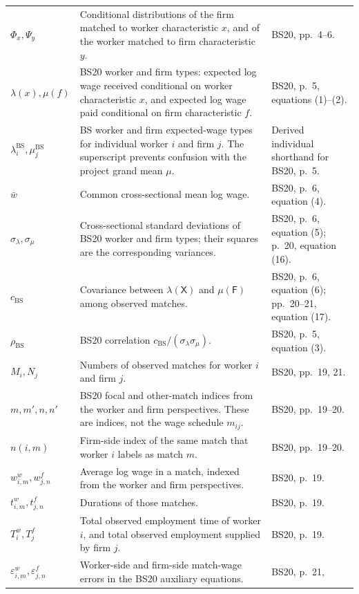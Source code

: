 \documentclass[11pt]{article}
\begin{document}
\begin{longtable}{p{}p{}p{}}
\(\Phi_x,\Psi_y\) & Conditional distributions of the firm matched to worker
characteristic \(x\), and of the worker matched to firm characteristic \(y\).
& BS20, pp.\ 4--6. \\
\(\lambda(x),\mu(f)\) & BS20 worker and firm types: expected log wage received
conditional on worker characteristic \(x\), and expected log wage paid
conditional on firm characteristic \(f\). &
BS20, p.\ 5, equations (1)--(2). \\
\(\lambda_i^{\mathrm{BS}},\mu_j^{\mathrm{BS}}\) & BS worker and firm
expected-wage types for individual worker \(i\) and firm \(j\).  The
superscript prevents confusion with the project grand mean \(\mu\). &
Derived individual shorthand for BS20, p.\ 5. \\
\(\bar w\) & Common cross-sectional mean log wage. & BS20, p.\ 6,
equation (4). \\
\(\sigma_\lambda,\sigma_\mu\) & Cross-sectional standard deviations of BS20
worker and firm types; their squares are the corresponding variances. &
BS20, p.\ 6, equation (5); p.\ 20, equation (16). \\
\(c_{\mathrm{BS}}\) & Covariance between
\(\lambda(\mathsf X)\) and \(\mu(\mathsf F)\) among
observed matches. & BS20, p.\ 6, equation (6); pp.\ 20--21, equation (17). \\
\(\rho_{\mathrm{BS}}\) & BS20 correlation
\(c_{\mathrm{BS}}/(\sigma_\lambda\sigma_\mu)\). & BS20, p.\ 5,
equation (3). \\
\(M_i,N_j\) & Numbers of observed matches for worker \(i\) and firm \(j\). &
BS20, pp.\ 19, 21. \\
\(m,m',n,n'\) & BS20 focal and other-match indices from the worker and firm
perspectives.  These are indices, not the wage schedule \(m_{ij}\). &
BS20, pp.\ 19--20. \\
\(n(i,m)\) & Firm-side index of the same match that worker \(i\) labels as
match \(m\). & BS20, pp.\ 19--20. \\
\(w^w_{i,m},w^f_{j,n}\) & Average log wage in a match, indexed from the worker
and firm perspectives. & BS20, p.\ 19. \\
\(t^w_{i,m},t^f_{j,n}\) & Durations of those matches. & BS20, p.\ 19. \\
\(T_i^w,T_j^f\) & Total observed employment time of worker \(i\), and total
observed employment supplied by firm \(j\). & BS20, p.\ 19. \\
\(\varepsilon^w_{i,m},\varepsilon^f_{j,n}\) & Worker-side and firm-side
match-wage errors in the BS20 auxiliary equations. & BS20, p.\ 21,

\end{longtable}
\end{document}
